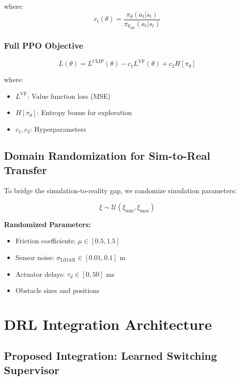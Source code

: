 \documentclass[11pt,a4paper]{article}
\begin{document}
where:
\begin{equation}
  r_t(\theta) = \frac{\pi_\theta(a_t|s_t)}{\pi_{\theta_{\text{old}}}(a_t|s_t)}
\end{equation}

\subsubsection{Full PPO Objective}

\begin{equation}
  L(\theta) = L^{\text{CLIP}}(\theta) - c_1 L^{\text{VF}}(\theta) + c_2 H[\pi_\theta]
\end{equation}

where:
\begin{itemize}
  \item $L^{\text{VF}}$: Value function loss (MSE)
  \item $H[\pi_\theta]$: Entropy bonus for exploration
  \item $c_1, c_2$: Hyperparameters
\end{itemize}

\subsection{Domain Randomization for Sim-to-Real Transfer}

To bridge the simulation-to-reality gap, we randomize simulation parameters:

\begin{equation}
  \xi \sim \mathcal{U}(\xi_{\min}, \xi_{\max})
\end{equation}

\textbf{Randomized Parameters:}
\begin{itemize}
  \item Friction coefficients: $\mu \in [0.5, 1.5]$
  \item Sensor noise: $\sigma_{\text{LiDAR}} \in [0.01, 0.1]$ m
  \item Actuator delays: $\tau_d \in [0, 50]$ ms
  \item Obstacle sizes and positions
\end{itemize}

\section{DRL Integration Architecture}

\subsection{Proposed Integration: Learned Switching Supervisor}
\end{document}
